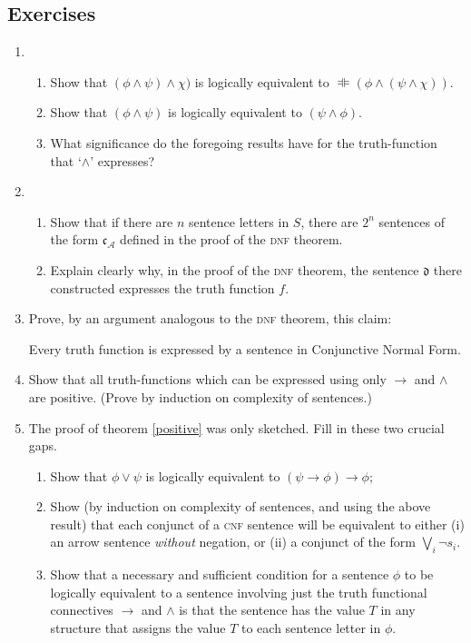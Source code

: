 {\small

\subsection*{Exercises} \label{ex:l1meta}

\begin{enumerate}
\item \begin{enumerate}
	\item Show that $(\phi\wedge \psi)\wedge \chi)$ is logically equivalent to $\DashVDash (\phi\wedge(\psi\wedge \chi))$.
	\item Show that $(\phi\wedge \psi)$ is logically equivalent to $(\psi \wedge \phi)$.
	\item What significance do the foregoing results have for the truth-function that `$\wedge$' expresses?  
\end{enumerate}

\item \begin{enumerate}
	
	\item Show that if there are $n$ sentence letters in $S$, there are $2^{n}$ sentences of the form $\mathfrak{c}_{\mathscr{A}}$ defined in the proof of the \textsc{\lowercase{DNF}} theorem.
\item Explain clearly why, in the proof of the \textsc{\lowercase{DNF}} theorem, the sentence $\mathfrak{d}$ there constructed expresses the truth function $f$.
\end{enumerate}
\item  Prove, by an argument analogous to the \textsc{\lowercase{DNF}} theorem, this claim: \begin{theorem} 	Every truth function is expressed by a sentence in Conjunctive Normal Form.\end{theorem}
\item Show that  all truth-functions which can be expressed using only $\to$ and $\wedge$ are positive. (Prove by induction on complexity of sentences.)

\item The proof of theorem \ref{positive} was only sketched. Fill in these two crucial gaps.\begin{enumerate} 
	\item Show that $\phi\vee \psi$ is logically equivalent to $(\psi \to \phi)\to \phi$;
	\item Show (by induction on complexity of sentences, and using the above result) that each conjunct of a \textsc{\lowercase{CNF}} sentence will be equivalent to either (i) an arrow sentence \emph{without} negation, or (ii)  a conjunct  of the form $\bigvee_{i} \neg s_{i}$.
		\item	 Show that a necessary and sufficient condition for a sentence $\phi$ to be logically equivalent to a sentence involving just the truth functional connectives $\to$ and $\wedge$ is that the sentence has the value $T$ in any structure that assigns the value $T$ to each sentence letter in $\phi$. \end{enumerate}


\end{enumerate}}
